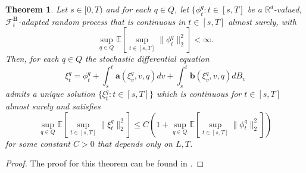 \documentclass[12pt]{article}
\newtheorem{theorem}{Theorem}[section]
\theoremstyle{definition}
\numberwithin{equation}{section}
\newcommand{\R}{\mathbb{R}}
\newcommand{\CF}{\mathcal{F}}
\newcommand{\ev}[1]{\mathbb{E}\left[{#1}\right]}
\newcommand{\norm}[1]{\lVert{#1}\rVert_2}
\begin{document}
\begin{theorem}
  \label{thm:sde_existence}
  Let $s \in [0,T)$ and for each $q \in Q$, let $\{\phi_t^q : t \in [s,T]$ be a $\R^d$-valued, $\CF^\mathbf{B}_t$-adapted random process that is continuous in $t \in [s,T]$ almost surely, with
  \begin{equation*}
    \sup_{q \in Q} \ev{\sup_{t \in [s,T]} \norm{\phi^q_t}^2} < \infty.
  \end{equation*}
  Then, for each $q \in Q$ the stochastic differential equation
  \begin{equation*}
    \xi^q_t = \phi_t^q + \int_s^t \mathbf{a}(\xi^q_v,v,q)dv + \int_s^t\mathbf{b}(\xi_v^q, v, q)dB_v
  \end{equation*}
  admits a unique solution $\{\xi_t^q : t \in [s,T]\}$ which is continuous for $t\in [s,T]$ almost surely and satisfies
  \begin{equation*}
    \sup_{q \in Q} \ev{\sup_{t \in [s,T]} \norm{\xi^q_t}^2} \leq C \left( 1 + \sup_{q \in Q} \ev{\sup_{t \in [s,T]} \norm{\phi^q_t}^2}\right)
  \end{equation*}
  for some constant $C > 0$ that depends only on $L,T$.
\end{theorem}
\begin{proof}
  The proof for this theorem can be found in \cite{liStochasticModifiedEquations2019}.
\end{proof}
\end{document}
